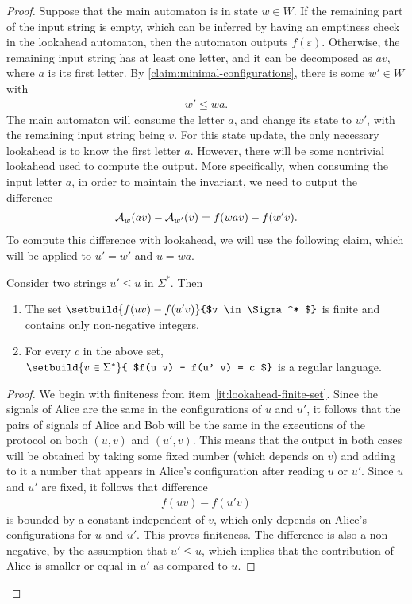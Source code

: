 \begin{proof}
Suppose that the main automaton is in state $w \in W$. If the remaining part of the input string is empty, which can be inferred by having an emptiness check in the lookahead automaton, then the automaton outputs $f(\varepsilon)$. Otherwise, the remaining input string has at least one letter, and it can be decomposed as $av$, where $a$ is its first letter.  By \cref{claim:minimal-configurations}, there is some $w' \in W$ with
\begin{align*}
w' \leq wa.
\end{align*}
The main automaton will consume the letter $a$, and change its state to  $w'$, with the remaining input string being $v$. For this state update, the only necessary lookahead is to know the first letter $a$. However, there will be some nontrivial lookahead used to compute the output. More specifically, when consuming the input letter $a$, in order to maintain the invariant, we  need to output the difference 
\begin{align}
  \label{eq:unary-difference-output}
\Aa_{w}(av) - \Aa_{w'}(v)  = f(wa v) -  f(w' v).
\end{align}
To compute this difference with lookahead, we will use the following claim, which will be applied to $u' = w'$ and $u = wa$.



\begin{claim}\label{claim:lookahead-regular-languages}
  Consider two strings $u' \leq u$ in $\Sigma^*$. Then
  \begin{enumerate}
    \item \label{it:lookahead-finite-set} The set $\setbuild{ f(uv) - f(u' v)}{$v \in \Sigma^* $}$ is finite and contains only non-negative integers.
    \item \label{it:lookahead-regular-language} For every $c$ in the above set, $\setbuild{ v \in \Sigma^*}{ $f(u v) - f(u' v) = c $}$ is a regular language.
  \end{enumerate}
\end{claim}
\begin{proof}
  We begin with finiteness  from item~\ref{it:lookahead-finite-set}. Since the signals of Alice are the same in the configurations of $u$ and $u'$, it follows that the pairs of signals of Alice and Bob will be the same in the executions of the protocol on both $(u,v)$ and $(u',v)$. This means that the output in both cases will be obtained by taking some fixed number (which depends on $v$) and adding to it a number that appears in Alice's configuration after reading $u$ or $u'$. Since $u$ and $u'$ are fixed, it follows that difference 
  \begin{align*}
  f(uv) - f(u'v)
  \end{align*}
  is bounded by a constant independent of $v$, which only depends on Alice's configurations for $u$ and $u'$. This proves finiteness. The difference is also a non-negative, by the assumption that $u' \leq u$, which implies that the contribution of Alice is smaller or equal in $u'$ as compared to $u$.


\end{proof}
\end{proof}
